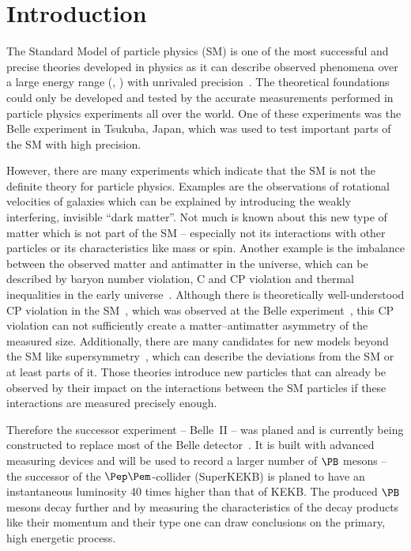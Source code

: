 \chapter{Introduction}

The Standard Model of particle physics (SM) is one of the most successful and precise theories developed in physics as it can describe observed phenomena over a large energy range (\cite{omg}, \cite{hydrogen}) with unrivaled precision~\cite{mu}. The theoretical foundations could only be developed and tested by the accurate measurements performed in particle physics experiments all over the world. One of these experiments was the Belle experiment in Tsukuba, Japan, which was used to test important parts of the SM with high precision. 

However, there are many experiments which indicate that the SM is not the definite theory for particle physics. Examples are the observations of rotational velocities of galaxies \cite{galaxy} which can be explained by introducing the weakly interfering, invisible ``dark matter''. Not much is known about this new type of matter which is not part of the SM -- especially not its interactions with other particles or its characteristics like mass or spin. Another example is the imbalance between the observed matter and antimatter in the universe, which can be described by baryon number violation, C and CP violation and thermal inequalities in the early universe~\cite{sakharov}. Although there is theoretically well-understood CP violation in the SM~\cite{CP_theory}, which was observed at the Belle experiment~\cite{CP}, this CP violation can not sufficiently create a matter--antimatter asymmetry of the measured size. Additionally, there are many candidates for new models beyond the SM like supersymmetry~\cite{susy}, which can describe the deviations from the SM or at least parts of it. Those theories introduce new particles that can already be observed by their impact on the interactions between the SM particles if these interactions are measured precisely enough.

Therefore the successor experiment -- Belle~II -- was planed and is currently being constructed to replace most of the Belle detector~\cite{tdr}. It is built with advanced measuring devices and will be used to record a larger number of $\PB$ mesons -- the successor of the $\Pep\Pem$-collider (SuperKEKB) is planed to have an instantaneous luminosity 40 times higher than that of KEKB. The produced $\PB$ mesons decay further and by measuring the characteristics of the decay products like their momentum and their type one can draw conclusions on the primary, high energetic process.

